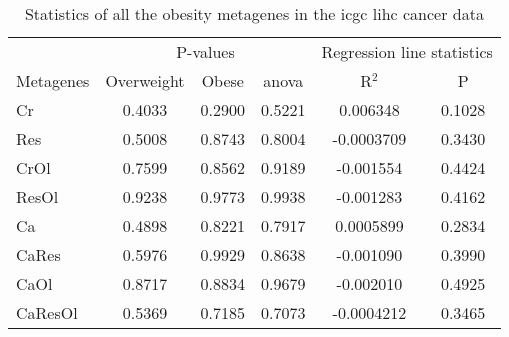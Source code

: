 \begin{appendices}
\begin{table}[htpb]
	\centering
	\caption[Statistics of all the obesity metagenes in the \gls{icgc} \acrshort{lihc} cancer data]{Statistics of all the obesity metagenes in the \gls{icgc} \gls{lihc} cancer data}
	\label{tab:degmetalihc}
	\begin{threeparttable}
		\begin{tabular}{lccccc}
			& \multicolumn{3}{c}{ P-values} & \multicolumn{2}{c}{ Regression line statistics}\\
			\cmidrule(r){2-4} \cmidrule(r){5-6}
			Metagenes &  Overweight &  Obese &  \gls{anova} &  R$^2$ &  P \\
			\hline
			\hline
			\rule{0pt}{2.25ex}Cr      & 0.4033                      & 0.2900  & 0.5221             & 0.006348   & 0.1028              \\
			Res     & 0.5008                      & 0.8743  & 0.8004             & -0.0003709 & 0.3430              \\
			CrOl    & 0.7599                      & 0.8562  & 0.9189             & -0.001554  & 0.4424              \\
			ResOl   & 0.9238                      & 0.9773  & 0.9938             & -0.001283  & 0.4162              \\
			Ca      & 0.4898                      & 0.8221  & 0.7917             & 0.0005899  & 0.2834              \\
			CaRes   & 0.5976                      & 0.9929  & 0.8638             & -0.001090  & 0.3990              \\
			CaOl    & 0.8717                      & 0.8834  & 0.9679             & -0.002010  & 0.4925              \\
			CaResOl & 0.5369                      & 0.7185  & 0.7073             & -0.0004212 & 0.3465              \\
			\hline
			\hline
		\end{tabular}
	\end{threeparttable}
\end{table}


\end{appendices}
